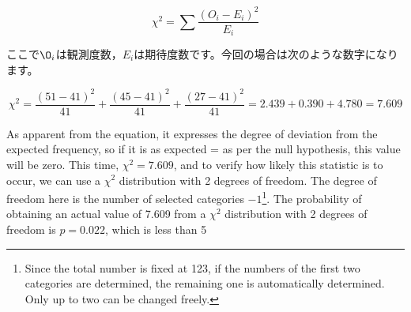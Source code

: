\documentclass{ltjsbook}
\begin{document}
\[ \chi^2 = \sum \frac{(O_i - E_i)^2}{E_i} \]

ここで$\O_i$は観測度数，$E_i$は期待度数です。今回の場合は次のような数字になります。

\[ \chi^2 = \frac{(51-41)^2}{41} + \frac{(45-41)^2}{41} + \frac{(27-41)^2}{41} = 2.439+0.390+4.780=7.609 \]

As apparent from the equation, it expresses the degree of deviation from the expected frequency, so if it is as expected = as per the null hypothesis, this value will be zero.
This time, $\chi^2=7.609$, and to verify how likely this statistic is to occur, we can use a $\chi^2$ distribution with 2 degrees of freedom. The degree of freedom here is the number of selected categories $-1$\footnote{Since the total number is fixed at 123, if the numbers of the first two categories are determined, the remaining one is automatically determined. Only up to two can be changed freely.}. The probability of obtaining an actual value of 7.609 from a $\chi^2$ distribution with 2 degrees of freedom is $p=0.022$, which is less than 5%
\end{document}
